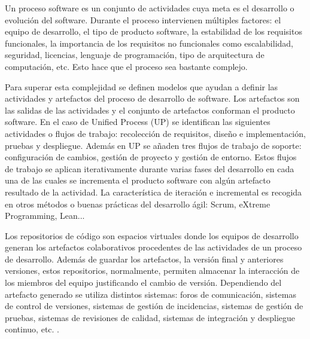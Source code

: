 

Un proceso software es un conjunto de actividades cuya meta es el desarrollo o evolución del software. Durante el proceso intervienen múltiples factores: el equipo de desarrollo, el tipo de producto software, la estabilidad de los requisitos funcionales, la importancia de los requisitos no funcionales como escalabilidad, seguridad, licencias, lenguaje de programación, tipo de arquitectura de computación, etc. Esto hace que el proceso sea bastante complejo.

Para superar esta complejidad se definen modelos que ayudan a definir las actividades y artefactos del proceso de desarrollo de software. Los artefactos son las salidas de las actividades y el conjunto de artefactos conforman el producto software. En el caso de  Unified Process (UP) \citep{jacobson_proceso_2000} se identifican las siguientes actividades o flujos de trabajo: recolección de requisitos, diseño e implementación, pruebas y despliegue. Además en UP se añaden tres flujos de trabajo de soporte: configuración de cambios, gestión de proyecto y gestión de entorno. Estos flujos de trabajo se aplican iterativamente durante varias fases del desarrollo en cada una de las cuales se incrementa el producto software con algún artefacto resultado de la actividad. La característica de iteración e incremental es recogida en otros métodos o buenas prácticas del desarrollo ágil: Scrum, eXtreme Programming, Lean...


Los repositorios de código son espacios virtuales donde los equipos de desarrollo generan los artefactos colaborativos procedentes de las actividades de un proceso de desarrollo. Además de guardar los artefactos, la versión final y anteriores versiones, estos repositorios, normalmente, permiten almacenar la interacción de los miembros del equipo justificando el cambio de versión. Dependiendo del artefacto generado se utiliza distintos sistemas: foros de comunicación, sistemas de control de versiones, sistemas de gestión de incidencias, sistemas de gestión de pruebas, sistemas de revisiones de calidad, sistemas de integración y despliegue continuo, etc. \citep{guemes-pena_emerging_2018}.


